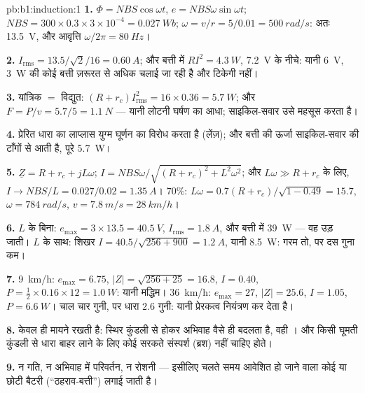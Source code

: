\begin{solution}{pb:b1:induction:1}
\textbf{1.} $\Phi = NBS\cos\omega t$, $e = NBS\omega\sin\omega t$; $NBS = 300 \times
0.3 \times 3 \times 10^{-4} = \qty{0.027}{Wb}$; $\omega = v/r = 5/0.01 = \qty{500}{rad/s}$:
अतः  \qty{13.5}{V}, और आवृत्ति $\omega/2\pi = \qty{80}{Hz}$।

\textbf{2.} $I_{\mathrm{rms}} = 13.5/\sqrt2/16 = \qty{0.60}{A}$; और बत्ती में $RI^2 = \qty{4.3}{W}$,
\qty{7.2}{V} के नीचे: यानी \qty{6}{V}, \qty{3}{W} की कोई बत्ती ज़रूरत से
अधिक चलाई जा रही है और टिकेगी नहीं।

\textbf{3.} यांत्रिक $=$ विद्युत: $(R + r_c)I_{\mathrm{rms}}^2 = 16 \times 0.36 =
\qty{5.7}{W}$; और $F = P/v = 5.7/5 = \qty{1.1}{N}$ --- यानी लोटनी घर्षण का
आधा; साइकिल-सवार उसे महसूस करता है।

\textbf{4.} प्रेरित धारा का लाप्लास युग्म घूर्णन का विरोध करता है (लेंज़);
और बत्ती की ऊर्जा साइकिल-सवार की टाँगों से आती है, पूरे \qty{5.7}{W}।

\textbf{5.} $\underline Z = R + r_c + jL\omega$; $I = NBS\omega/\sqrt{(R + r_c)^2 + L^2\omega^2}$;
और $L\omega \gg R + r_c$ के लिए, $I \to NBS/L = 0.027/0.02 = \qty{1.35}{A}$। $70\%$: $L\omega
= 0.7(R + r_c)/\sqrt{1 - 0.49} = 15.7$, $\omega = \qty{784}{rad/s}$, $v = \qty{7.8}{m/s}
= \qty{28}{km/h}$।

\textbf{6.} $L$ के बिना: $e_{\max} = 3 \times 13.5 = \qty{40.5}{V}$, $I_{\mathrm{rms}} =
\qty{1.8}{A}$, और बत्ती में \qty{39}{W} --- वह उड़ जाती। $L$ के साथ: शिखर $I = 40.5/\sqrt{256 +
900} = \qty{1.2}{A}$, यानी \qty{8.5}{W}: गरम तो, पर दस गुना कम।

\textbf{7.} \qty{9}{km/h}: $e_{\max} = 6.75$, $|Z| = \sqrt{256 + 25} = 16.8$, $I = 0.40$,
$P = \tfrac12 \times 0.16 \times 12 = \qty{1.0}{W}$: यानी मद्धिम। \qty{36}{km/h}: $e_{\max} = 27$,
$|Z| = 25.6$, $I = 1.05$, $P = \qty{6.6}{W}$। चाल चार गुनी, पर धारा $2.6$ गुनी:
यानी प्रेरकत्व नियंत्रण कर देता है।

\textbf{8.} केवल  ही मायने रखती है: स्थिर कुंडली से होकर अभिवाह
वैसे ही बदलता है, वही । और किसी घूमती कुंडली से धारा बाहर
लाने के लिए कोई सरकते संस्पर्श (ब्रश) नहीं चाहिए होते।

\textbf{9.} न गति, न अभिवाह में परिवर्तन, न रोशनी --- इसीलिए चलते समय आवेशित
हो जाने वाला कोई  या छोटी बैटरी (``ठहराव-बत्ती'') लगाई जाती है।


\end{solution}
